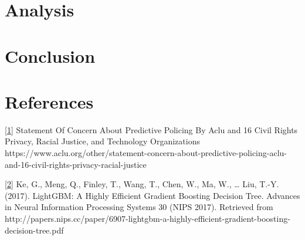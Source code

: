 \documentclass[11pt]{article}
\begin{document}
    \hypertarget{analysis}{%
\section{Analysis}\label{analysis}}

\hypertarget{conclusion}{%
\section{Conclusion}\label{conclusion}}

\hypertarget{references}{%
\section{References}\label{references}}

\href{https://www.aclu.org/other/statement-concern-about-predictive-policing-aclu-and-16-civil-rights-privacy-racial-justice}{{[}1{]}}
Statement Of Concern About Predictive Policing By Aclu and 16 Civil
Rights Privacy, Racial Justice, and Technology Organizations
https://www.aclu.org/other/statement-concern-about-predictive-policing-aclu-and-16-civil-rights-privacy-racial-justice

\href{http://papers.nips.cc/paper/6907-lightgbm-a-highly-efficient-gradient-boosting-decision-tree.pdf}{{[}2{]}}
Ke, G., Meng, Q., Finley, T., Wang, T., Chen, W., Ma, W., \ldots{} Liu,
T.-Y. (2017). LightGBM: A Highly Efficient Gradient Boosting Decision
Tree. Advances in Neural Information Processing Systems 30 (NIPS 2017).
Retrieved from
http://papers.nips.cc/paper/6907-lightgbm-a-highly-efficient-gradient-boosting-decision-tree.pdf


    
    
    
    
\end{document}
